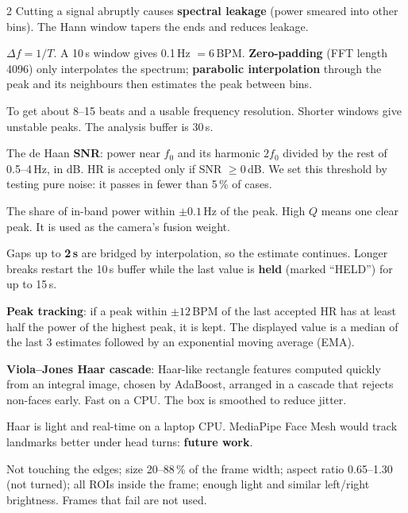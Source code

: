 \begin{multicols}{2}
{Cutting a signal abruptly causes \textbf{spectral leakage} (power smeared into other bins). The Hann window tapers the ends and
reduces leakage.}

{$\Delta f=1/T$. A 10\,s window gives 0.1\,Hz $=6$\,BPM. \textbf{Zero-padding} (FFT length 4096) only interpolates the spectrum;
\textbf{parabolic interpolation} through the peak and its neighbours then estimates the peak between bins.}

{To get about 8--15 beats and a usable frequency resolution. Shorter windows give unstable peaks. The analysis buffer is 30\,s.}

{The de Haan \textbf{SNR}: power near $f_0$ and its harmonic $2f_0$ divided by the rest of 0.5--4\,Hz, in dB. HR is accepted only if
SNR $\geq 0$\,dB. We set this threshold by testing pure noise: it passes in fewer than 5\,\% of cases.}

{The share of in-band power within $\pm0.1$\,Hz of the peak. High $Q$ means one clear peak. It is used as the camera's fusion
weight.}

{Gaps up to \textbf{2\,s} are bridged by interpolation, so the estimate continues. Longer breaks restart the 10\,s buffer while the
last value is \textbf{held} (marked ``HELD'') for up to 15\,s.}

{\textbf{Peak tracking}: if a peak within $\pm12$\,BPM of the last accepted HR has at least half the power of the highest peak,
it is kept. The displayed value is a median of the last 3 estimates followed by an exponential moving average (EMA).}

{\textbf{Viola--Jones Haar cascade}: Haar-like rectangle features computed quickly from an integral image, chosen by AdaBoost,
arranged in a cascade that rejects non-faces early. Fast on a CPU. The box is smoothed to reduce jitter.}

{Haar is light and real-time on a laptop CPU. MediaPipe Face Mesh would track landmarks better under head turns: \textbf{future
work}.}

{Not touching the edges; size 20--88\,\% of the frame width; aspect ratio 0.65--1.30 (not turned); all ROIs inside the frame;
enough light and similar left/right brightness. Frames that fail are not used.}


\end{multicols}
